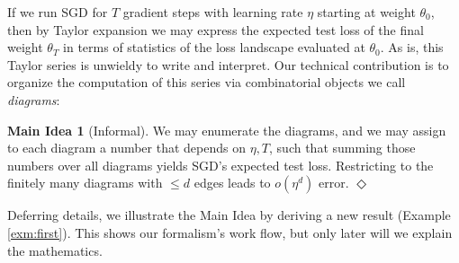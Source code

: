 \documentclass[openany, notitlepage, justified]{tufte-book}
\theoremstyle{plain}
\theoremstyle{definition}
\newtheorem*{midea*}{Main Idea}
\newcommand{\wasq}[1]{\left[#1\right]}
\newcommand{\expc}{\mathbb{E}}
\newcommand{\mend}{\hfill $\Diamond$}
\begin{document}
        \newcommand{\nb} { \nabla }
        \newcommand{\lx} { l_x(\theta) }
        \newcommand{\teq} { \triangleq }
        \newcommand{\ex}[1] { \expc_x \wasq{#1} }

        If we run SGD for $T$ gradient steps with learning rate $\eta$ starting
        at weight $\theta_0$, then by Taylor expansion we may express the
        expected test loss of the final weight $\theta_T$ in terms of
        statistics of the loss landscape evaluated at $\theta_0$.
        As is, this Taylor series is unwieldy to write and interpret.
        Our technical contribution is to organize the computation of this
        series via combinatorial objects we call
        \emph{diagrams}:
        \begin{midea*}[Informal]
            We may enumerate the diagrams, and we may assign to
            each diagram a number that depends on $\eta, T$, such that
            summing those numbers over all diagrams yields SGD's expected test
            loss.  Restricting to the finitely many diagrams with $\leq d$
            edges leads to $o(\eta^d)$ error.
            \mend
        \end{midea*}

        Deferring details, we illustrate the Main Idea by deriving a new result
        (Example \ref{exm:first}).  This shows our formalism's work flow,
        but only later will we explain the mathematics.
\end{document}
